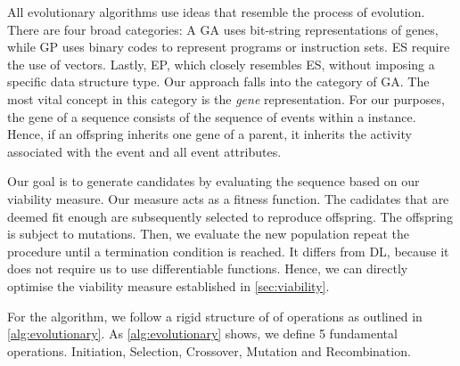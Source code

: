 \documentclass[./../../paper.tex]{subfiles}
\begin{document}





All evolutionary algorithms use ideas that resemble the process of evolution. There are four broad categories: A \gls{GA} uses bit-string representations of genes, while \gls{GP} uses binary codes to represent programs or instruction sets. \gls{ES} require the use of vectors. Lastly, \gls{EP}, which closely resembles \gls{ES}, without imposing a specific data structure type\needscite. Our approach falls into the category of \gls{GA}. The most vital concept in this category is the \emph{gene} representation. For our purposes, the gene of a sequence consists of the sequence of events within a \gls{instance}. Hence, if an offspring inherits one gene of a parent, it inherits the activity associated with the event and all event attributes.

Our goal is to generate candidates by evaluating the sequence based on our viability measure. Our measure acts as a fitness function. The cadidates that are deemed fit enough are subsequently selected to reproduce offspring. The offspring is subject to mutations. Then, we evaluate the new population repeat the procedure until a termination condition is reached. It differs from \gls{DL}, because it does not require us to use differentiable functions. Hence, we can directly optimise the viability measure established in \autoref{sec:viability}.

For the algorithm, we follow a rigid structure of of operations as outlined in \autoref{alg:evolutionary}. As \autoref{alg:evolutionary} shows, we define 5 fundamental operations. Initiation, Selection, Crossover, Mutation and Recombination.
\end{document}
